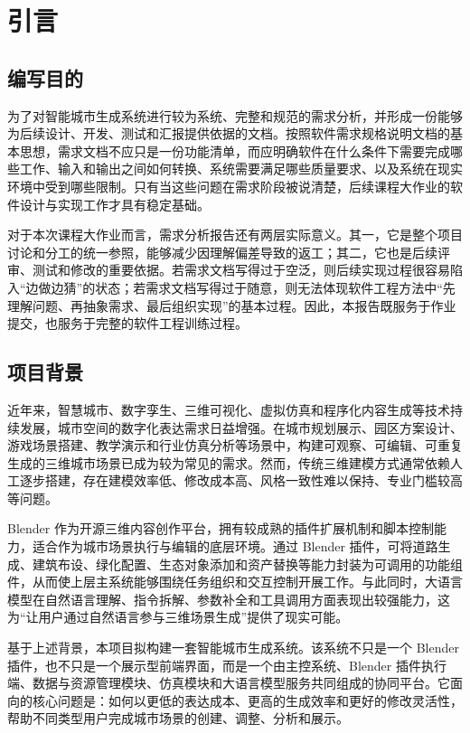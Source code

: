 \documentclass[UTF8,a4paper,10pt]{ctexart}
\begin{document}
\tableofcontents
\newpage

\section{引言}

\subsection{编写目的}
为了对智能城市生成系统进行较为系统、完整和规范的需求分析，并形成一份能够为后续设计、开发、测试和汇报提供依据的文档。按照软件需求规格说明文档的基本思想，需求文档不应只是一份功能清单，而应明确软件在什么条件下需要完成哪些工作、输入和输出之间如何转换、系统需要满足哪些质量要求、以及系统在现实环境中受到哪些限制。只有当这些问题在需求阶段被说清楚，后续课程大作业的软件设计与实现工作才具有稳定基础。

对于本次课程大作业而言，需求分析报告还有两层实际意义。其一，它是整个项目讨论和分工的统一参照，能够减少因理解偏差导致的返工；其二，它也是后续评审、测试和修改的重要依据。若需求文档写得过于空泛，则后续实现过程很容易陷入“边做边猜”的状态；若需求文档写得过于随意，则无法体现软件工程方法中“先理解问题、再抽象需求、最后组织实现”的基本过程。因此，本报告既服务于作业提交，也服务于完整的软件工程训练过程。

\subsection{项目背景}
近年来，智慧城市、数字孪生、三维可视化、虚拟仿真和程序化内容生成等技术持续发展，城市空间的数字化表达需求日益增强。在城市规划展示、园区方案设计、游戏场景搭建、教学演示和行业仿真分析等场景中，构建可观察、可编辑、可重复生成的三维城市场景已成为较为常见的需求。然而，传统三维建模方式通常依赖人工逐步搭建，存在建模效率低、修改成本高、风格一致性难以保持、专业门槛较高等问题。

Blender 作为开源三维内容创作平台，拥有较成熟的插件扩展机制和脚本控制能力，适合作为城市场景执行与编辑的底层环境。通过 Blender 插件，可将道路生成、建筑布设、绿化配置、生态对象添加和资产替换等能力封装为可调用的功能组件，从而使上层主系统能够围绕任务组织和交互控制开展工作。与此同时，大语言模型在自然语言理解、指令拆解、参数补全和工具调用方面表现出较强能力，这为“让用户通过自然语言参与三维场景生成”提供了现实可能。

基于上述背景，本项目拟构建一套智能城市生成系统。该系统不只是一个 Blender 插件，也不只是一个展示型前端界面，而是一个由主控系统、Blender 插件执行端、数据与资源管理模块、仿真模块和大语言模型服务共同组成的协同平台。它面向的核心问题是：如何以更低的表达成本、更高的生成效率和更好的修改灵活性，帮助不同类型用户完成城市场景的创建、调整、分析和展示。
\end{document}
